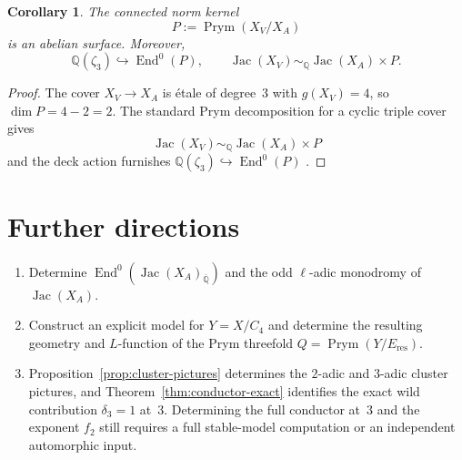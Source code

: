 \documentclass[11pt,letterpaper]{article}
\theoremstyle{plain}
\newtheorem{corollary}[theorem]{Corollary}
\theoremstyle{remark}
\newcommand{\QQ}{\mathbb{Q}}
\newcommand{\Jac}{\operatorname{Jac}}
\newcommand{\Prym}{\operatorname{Prym}}
\newcommand{\End}{\operatorname{End}}
\begin{document}
\begin{corollary}\label{cor:prym}
The connected norm kernel
\[
P:=\Prym(X_V/X_A)
\]
is an abelian surface. Moreover,
\[
\QQ(\zeta_3)\hookrightarrow \End^0(P),
\qquad
\Jac(X_V)\sim_{\QQ}\Jac(X_A)\times P.
\]
\end{corollary}

\begin{proof}
The cover \(X_V\to X_A\) is \'etale of degree~\(3\) with \(g(X_V)=4\), so \(\dim P=4-2=2\). The standard Prym decomposition for a cyclic triple cover gives
\[
\Jac(X_V)\sim_{\QQ}\Jac(X_A)\times P
\]
and the deck action furnishes \(\QQ(\zeta_3)\hookrightarrow \End^0(P)\) \cite[Section~12.9]{BirkenhakeLange2004}.
\end{proof}





\section{Further directions}

\begin{enumerate}
\item[(1)] Determine \(\End^0(\Jac(X_A)_{\overline{\QQ}})\) and the odd \(\ell\)-adic monodromy of \(\Jac(X_A)\).

\item[(2)] Construct an explicit model for \(Y=X/C_4\) and determine the resulting geometry and \(L\)-function of the Prym threefold \(Q=\Prym(Y/E_{\mathrm{res}})\).

\item[(3)] Proposition~\ref{prop:cluster-pictures} determines the \(2\)-adic and \(3\)-adic cluster pictures, and Theorem~\ref{thm:conductor-exact} identifies the exact wild contribution \(\delta_3=1\) at~\(3\). Determining the full conductor at~\(3\) and the exponent \(f_2\) still requires a full stable-model computation or an independent automorphic input.
\end{enumerate}
\end{document}
